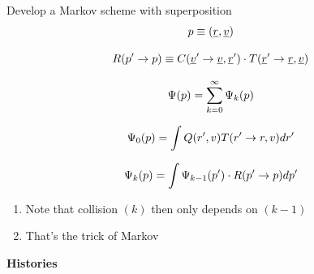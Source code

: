 \documentclass[aspectratio=1610,pdftex,dvipsnames,compress,xcolor={dvipsnames}]{beamer}
\begin{document}
\begin{frame}{Develop a Markov scheme with superposition}
    \begin{equation}
        \Large
        p \equiv (\underline{r},\underline{v})
    \end{equation}

    \begin{equation}
        \Large
        R(p' \rightarrow p) \equiv C(\underline{v}' \rightarrow \underline{v},\underline{r}') \cdot T(\underline{r}' \rightarrow \underline{r},\underline{v})
    \end{equation}

    \begin{equation}
        \Large
        \Psi(p) = \sum_{k=0}^{\infty} \Psi_k(p)
    \end{equation}

    \begin{equation}
        \Large
        \Psi_0(p) = \int Q(r',v) T(r' \rightarrow r,v)dr'
    \end{equation}

    \begin{equation}
        \Large
        \Psi_k(p)=\int \Psi_{k-1}(p') \cdot R(p' \rightarrow p)dp'
    \end{equation}

    \vspace*{\fill}

    \begin{enumerate}[series=outerlist,topsep=0pt,itemsep=11pt,leftmargin=*,label=(\arabic*)]
        \item[]Note that collision $(k)$ then only depends on $(k-1)$
        \item[]That's the trick of Markov
    \end{enumerate}
\end{frame}


\begin{frame}[plain]{}
    \centering\LARGE\textbf{Histories}
\end{frame}
\end{document}
